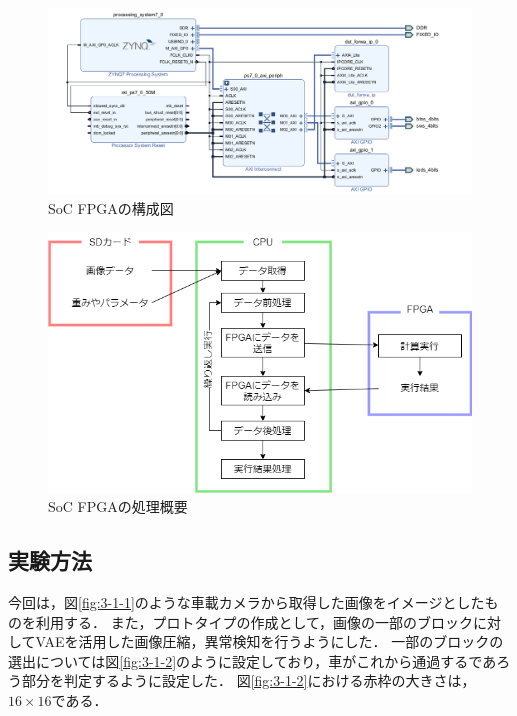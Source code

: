 \documentclass[paper]{ieicej}
\begin{document}
\begin{figure}[tb]
  \begin{center}
    \includegraphics[width=0.98\columnwidth]{figures/SoC_1.png}
  \end{center}
  \caption{SoC FPGAの構成図}
  \label{fig:2-2-4-1}
\end{figure}

\begin{figure}[tb]
  \begin{center}
    \includegraphics[width=0.98\columnwidth]{figures/SoC_2.png}
  \end{center}
  \caption{SoC FPGAの処理概要}
  \label{fig:2-2-4-2}
\end{figure}

\subsection{実験方法}
今回は，図\ref{fig:3-1-1}のような車載カメラから取得した画像をイメージとしたものを利用する．
また，プロトタイプの作成として，画像の一部のブロックに対してVAEを活用した画像圧縮，異常検知を行うようにした．
一部のブロックの選出については図\ref{fig:3-1-2}のように設定しており，車がこれから通過するであろう部分を判定するように設定した．
図\ref{fig:3-1-2}における赤枠の大きさは，$16\times16$である．
\end{document}
